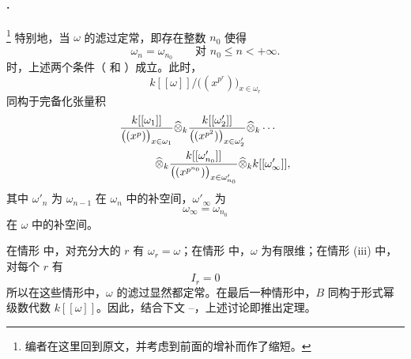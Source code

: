 
\paragraph{.}
\label{sga3:VIIB:5.2.1.C}
\footnote{\label{sga3:VIIB:nde:157}编者在这里回到原文，并考虑到前面的增补而作了缩短。}
特别地，当 \(\omega\) 的滤过定常，即存在整数 \(n_0\) 使得
\[
  \omega_n=\omega_{n_0}
  \qquad
  \text{对 }n_0\leq n<+\infty.
\]
时，上述两个条件\textup{（ 和 ）}成立。此时，
\[
  k[[\omega]]
  \big/
  \bigl((x^{p^r})\bigr)_{x\in\omega_r}
\]
同构于完备化张量积
\[
\begin{aligned}
  &
  \frac{k[[\omega_1]]}
       {\bigl((x^p)\bigr)_{x\in\omega_1}}
  \widehat\otimes_k
  \frac{k[[\omega'_2]]}
       {\bigl((x^{p^2})\bigr)_{x\in\omega'_2}}
  \widehat\otimes_k\cdots
  \\
  &\hspace{3.2em}
  {}\widehat\otimes_k
  \frac{k[[\omega'_{n_0}]]}
       {\bigl((x^{p^{n_0}})\bigr)_{x\in\omega'_{n_0}}}
  \widehat\otimes_k
  k[[\omega'_\infty]],
\end{aligned}
\]
其中 \(\omega'_n\) 为 \(\omega_{n-1}\) 在 \(\omega_n\) 中的补空间，\(\omega'_\infty\) 为
\[
  \omega_\infty=\omega_{n_0}
\]
在 \(\omega\) 中的补空间。

在情形 \textup{} 中，对充分大的 \(r\) 有 \(\omega_r=\omega\)；在情形 \textup{} 中，\(\omega\) 为有限维；在情形 \textup{(iii)} 中，对每个 \(r\) 有
\[
  I_r=0
\]
所以在这些情形中，\(\omega\) 的滤过显然都定常。在最后一种情形中，\(B\) 同构于形式幂级数代数 \(k[[\omega]]\)。因此，结合下文 --，上述讨论即推出定理。
